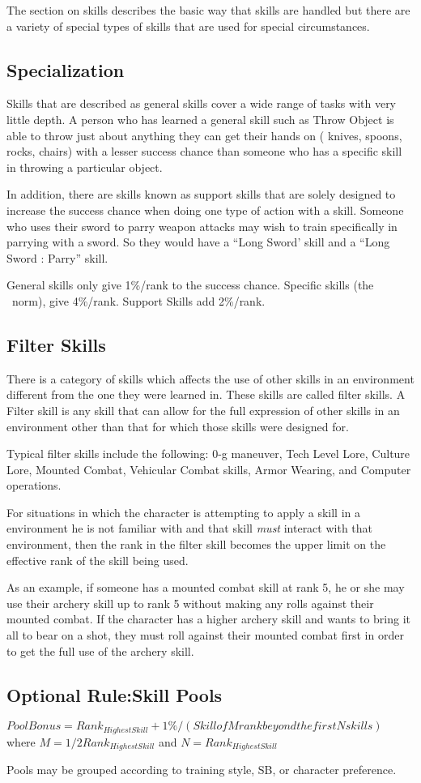 The section on skills describes the basic way that skills are 
handled but there are a variety of special types of skills that are 
used for special circumstances.

\subsection{Specialization}

Skills that are described as general skills cover a wide range of 
tasks with very little depth. A person who has learned a general 
skill such as Throw Object is able to throw just about anything they 
can get their hands on ( knives, spoons, rocks, chairs) with a lesser 
success chance than someone who has a specific skill in throwing a
particular object.

In addition, there are skills known as support skills that are solely 
designed to increase the success chance when doing one type of action 
with a skill. Someone who uses their sword to parry weapon attacks 
may wish to train specifically in parrying with a sword. So they 
would have a ``Long Sword' skill and a ``Long Sword : Parry'' skill.

General skills only give 1\%/rank to the success chance. Specific 
skills (the \SH\ norm), give 4\%/rank. Support Skills add 2\%/rank.

\subsection{Filter Skills}

There is a category of skills which affects the use of other skills 
in an environment different from the one they were learned in. These skills 
are called filter skills. A Filter skill is any skill that can allow 
for the full expression of other skills in an environment other than 
that for which those skills were designed for.

Typical filter skills include the following: 0-g maneuver, Tech 
Level Lore, Culture Lore, Mounted Combat, Vehicular Combat 
skills, Armor Wearing, and Computer operations.

For situations in which the character is attempting to apply a skill 
in a environment he is not familiar with and that skill {\em must }
interact with that environment, then the rank in the filter skill 
becomes the upper limit on the effective rank of the skill being 
used.

As an example, if someone has a mounted combat skill at rank 5, he or she
may use their archery skill up to rank 5 without making any rolls
against their mounted combat. If the character has a higher archery skill
and wants to bring it all to bear on a shot, they must roll against
their mounted combat first in order to get the full use of the archery
skill.

\subsection{Optional Rule:Skill Pools}

$ Pool Bonus = Rank_{Highest Skill} + 1\%/(Skill of M rank beyond the
first N skills ) $ where $ M = 1/2 Rank_{Highest Skill} $ and $ N =
Rank_{Highest Skill} $

Pools may be grouped according to training style, SB, or character
preference. 
